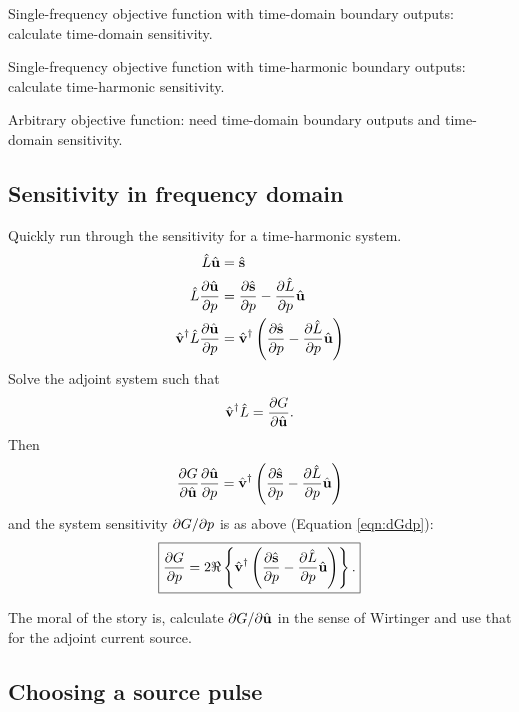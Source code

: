 Single-frequency objective function with time-domain boundary outputs: calculate time-domain sensitivity.

Single-frequency objective function with time-harmonic boundary outputs: calculate time-harmonic sensitivity.

Arbitrary objective function: need time-domain boundary outputs and time-domain sensitivity.

\subsection{Sensitivity in frequency domain}

Quickly run through the sensitivity for a time-harmonic system.
%
\begin{equation}
\begin{aligned}
	\hat{L} \hat{\textbf{u}} &= \hat{\textbf{s}} \\
	\hat{L} \frac{\partial{\hat{\textbf{u}}}}{\partial{p}} &= \frac{\partial{\hat{\textbf{s}}}}{\partial{p}} - \frac{\partial{\hat{L}}}{\partial{p}} \hat{\textbf{u}} \\
	\hat{\textbf{v}}^\dagger \hat{L} \frac{\partial{\hat{\textbf{u}}}}{\partial{p}} &= \hat{\textbf{v}}^\dagger \left( \frac{\partial{\hat{\textbf{s}}}}{\partial{p}} - \frac{\partial{\hat{L}}}{\partial{p}} \hat{\textbf{u}} \right)
\end{aligned}
\end{equation}
%
Solve the adjoint system such that
%
\begin{equation}
\hat{\textbf{v}}^\dagger \hat{L} = \frac{\partial{G}}{\partial{\hat{\textbf{u}}}}.
\end{equation}
%
Then
%
\begin{equation}
\frac{\partial{G}}{\partial{\hat{\textbf{u}}}} \frac{\partial{\hat{\textbf{u}}}}{\partial{p}} =  \hat{\textbf{v}}^\dagger \left( \frac{\partial{\hat{\textbf{s}}}}{\partial{p}} - \frac{\partial{\hat{L}}}{\partial{p}} \hat{\textbf{u}} \right)
\end{equation}
%
and the system sensitivity $\partial{G}/\partial{p}$ is as above (Equation \ref{eqn:dGdp}):
%
\begin{equation}
\boxed{
\pp{G}{p} = 2  \Re \left\{ \hat{\ve v}^\dagger \left( \pp{\hat{\ve s}}{p} - \pp{\hat{L}}{p} \hat{\ve u} \right) \right\}.
} %
\end{equation}

The moral of the story is, calculate $\partial{G}/\partial{\hat{\textbf{u}}}$ in the sense of Wirtinger and use that for the adjoint current source.

\subsection{Choosing a source pulse}

